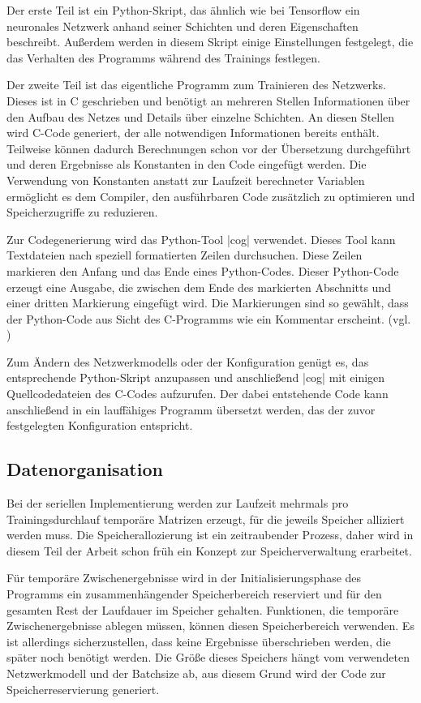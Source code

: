 \documentclass[../main.tex]{subfiles}
\begin{document}
Der erste Teil ist ein Python-Skript, das ähnlich wie bei Tensorflow ein neuronales Netzwerk anhand seiner Schichten und deren Eigenschaften beschreibt. Außerdem werden in diesem Skript einige Einstellungen festgelegt, die das Verhalten des Programms während des Trainings festlegen. 

Der zweite Teil ist das eigentliche Programm zum Trainieren des Netzwerks. Dieses ist in C geschrieben und benötigt an mehreren Stellen Informationen über den Aufbau des Netzes und Details über einzelne Schichten. An diesen Stellen wird C-Code generiert, der alle notwendigen Informationen bereits enthält. Teilweise können dadurch Berechnungen schon vor der Übersetzung durchgeführt und deren Ergebnisse als Konstanten in den Code eingefügt werden. Die Verwendung von Konstanten anstatt zur Laufzeit berechneter Variablen ermöglicht es dem Compiler, den ausführbaren Code zusätzlich zu optimieren und Speicherzugriffe zu reduzieren. 

Zur Codegenerierung wird das Python-Tool |cog| verwendet. Dieses Tool kann Textdateien nach speziell formatierten Zeilen durchsuchen. Diese Zeilen markieren den Anfang und das Ende eines Python-Codes. Dieser Python-Code erzeugt eine Ausgabe, die zwischen dem Ende des markierten Abschnitts und einer dritten Markierung eingefügt wird. Die Markierungen sind so gewählt, dass der Python-Code aus Sicht des C-Programms wie ein Kommentar erscheint. (vgl. \cite{COGdocumentation})

Zum Ändern des Netzwerkmodells oder der Konfiguration genügt es, das entsprechende Python-Skript anzupassen und anschließend |cog| mit einigen Quellcodedateien des C-Codes aufzurufen. Der dabei entstehende Code kann anschließend in ein lauffähiges Programm übersetzt werden, das der zuvor festgelegten Konfiguration entspricht. 

\subsection{Datenorganisation}
Bei der seriellen Implementierung werden zur Laufzeit mehrmals pro Trainingsdurchlauf temporäre Matrizen erzeugt, für die jeweils Speicher alliziert werden muss. Die Speicherallozierung ist ein zeitraubender Prozess, daher wird in diesem Teil der Arbeit schon früh ein Konzept zur Speicherverwaltung erarbeitet. 

Für temporäre Zwischenergebnisse wird in der Initialisierungsphase des Programms ein zusammenhängender Speicherbereich reserviert und für den gesamten Rest der Laufdauer im Speicher gehalten. Funktionen, die temporäre Zwischenergebnisse ablegen müssen, können diesen Speicherbereich verwenden. Es ist allerdings sicherzustellen, dass keine Ergebnisse überschrieben werden, die später noch benötigt werden. Die Größe dieses Speichers hängt vom verwendeten Netzwerkmodell und der Batchsize ab, aus diesem Grund wird der Code zur Speicherreservierung generiert. 
\end{document}
